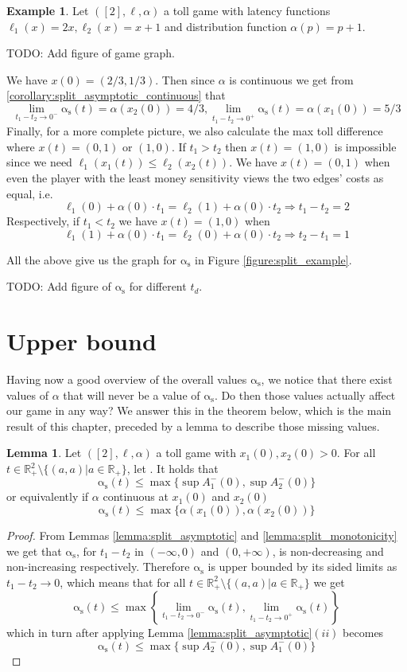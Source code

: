 \documentclass[10pt,a4paper]{book}
\newcommand{\as}{\mathrm{\alpha_s}}
\newcommand{\R}{\mathbb{R}}
\theoremstyle{definition}
\newtheorem{lemma}[definition]{Lemma}
\theoremstyle{comment}
\newtheorem{example}[definition]{Example}
\begin{document}
\begin{example}
	\label{example:simple_alpha}
	Let $([2], \ell, \alpha)$ a toll game with latency functions $\ell_1(x) = 2x, \ell_2(x) = x + 1$ and distribution function $\alpha(p) = p + 1$.
\end{example}
TODO: Add figure of game graph.

We have $x(0) = (2/3, 1/3)$.
Then since $\alpha$ is continuous we get from \ref{corollary:split_asymptotic_continuous} that
\[\lim_{t_1 - t_2 \rightarrow 0^-} \as(t) = \alpha(x_2(0)) = 4/3, \lim_{t_1 - t_2 \rightarrow 0^+} \as(t) = \alpha(x_1(0)) = 5/3\]
Finally, for a more complete picture, we also calculate the max toll difference where $x(t) = (0, 1)$ or $(1, 0)$.
If $t_1 > t_2$ then $x(t) = (1, 0)$ is impossible since we need $\ell_1(x_1(t)) \le \ell_2(x_2(t))$.
We have $x(t) = (0, 1)$ when even the player with the least money sensitivity views the two edges' costs as equal, i.e.
\[
	\ell_1(0) + \alpha(0) \cdot t_1 = \ell_2(1) + \alpha(0) \cdot t_2 \Rightarrow t_1 - t_2 = 2
\]
Respectively, if $t_1 < t_2$ we have $x(t) = (1, 0)$ when
\[
	\ell_1(1) + \alpha(0) \cdot t_1 = \ell_2(0) + \alpha(0) \cdot t_2 \Rightarrow t_2 - t_1 = 1
\]

All the above give us the graph for $\as$ in Figure \ref{figure:split_example}.

TODO: Add figure of $\as$ for different $t_d$.

\section{Upper bound}

Having now a good overview of the overall values $\as$, we notice that there exist values of $\alpha$ that will never be a value of $\as$.
Do then those values actually affect our game in any way?
We answer this in the theorem below, which is the main result of this chapter, preceded by a lemma to describe those missing values.

\begin{lemma}
	\label{lemma:as_upper_bound}
	Let $([2], \ell, \alpha)$ a toll game with $x_1(0), x_2(0) > 0$.
	For all $t \in \R_+^2 \setminus \{(a, a) | a \in \R_+\}$, let .
	It holds that
	\[\as(t) \le \max\{\sup A_1^-(0), \sup A_2^-(0)\}\]
	or equivalently if $\alpha$ continuous at $x_1(0)$ and $x_2(0)$
	\[\as(t) \le \max\{\alpha(x_1(0)), \alpha(x_2(0))\}\]
\end{lemma}

\begin{proof}
	 From Lemmas \ref{lemma:split_asymptotic} and \ref{lemma:split_monotonicity} we get that $\as$, for $t_1 - t_2$ in $(-\infty, 0)$ and $(0, +\infty)$, is non-decreasing and non-increasing respectively.
	 Therefore $\as$ is upper bounded by its sided limits as $t_1 - t_2 \rightarrow 0$, which means that for all $t \in \R_+^2 \setminus \{(a, a) | a \in \R_+\}$ we get
	 \[\as(t) \le \max\left\{\lim_{t_1 - t_2 \rightarrow 0^-}\as(t), \lim_{t_1 - t_2 \rightarrow 0^+}\as(t)\right\}\]
	 which in turn after applying Lemma \ref{lemma:split_asymptotic}$(ii)$ becomes
	 \[\as(t) \le \max\{\sup A_2^-(0), \sup A_1^-(0)\}\]
\end{proof}
\end{document}
